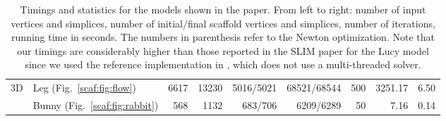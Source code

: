 \begin{table}[t]
\begin{adjustbox}{width=\columnwidth,totalheight=\textheight,keepaspectratio}
\begin{tabular}{llrrrrrrr}
\multirow{2}{*}{3D}&Leg (Fig.~\ref{scaf:fig:flow})
&6617&13230&5016/5021&68521/68544&500&3251.17&6.50\\
&Bunny (Fig.~\ref{scaf:fig:rabbit})
&568&1132&683/706&6209/6289&50&7.16&0.14\\

\hline
	\end{tabular}
	\end{adjustbox}
			\caption{Timings and statistics for the models shown in the paper. From left to right: number of input vertices and simplices, number of initial/final scaffold vertices and simplices, number of iterations, running time in seconds. The numbers in parenthesis refer to the Newton optimization. Note that our timings are considerably higher than those reported in the SLIM paper for the Lucy model since we used the reference implementation in \protect\cite{libigl}, which {does not use} a multi-threaded solver.}
	\label{tab:timings}
	\vspace{-0.2cm}
\end{table}
